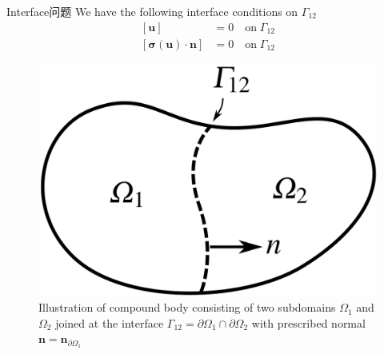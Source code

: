 \documentclass[lang=en,aspectratio=43,theme=default,logo=on]{simplebeamer}
\begin{document}
\begin{frame}{Interface问题}
We have the following interface conditions on $\Gamma_{12}$
\begin{align*}
    \left[\mathbf{u}\right] &=0 \quad \mathrm{on} \; \Gamma_{12} \\
    \left[\boldsymbol{\sigma}(\mathbf{u})\cdot \mathbf{n} \right] &=0 \quad \mathrm{on} \; \Gamma_{12}
\end{align*}
\begin{figure}
\centering %
\includegraphics[height=0.4\textheight]{./img/026.png}
\caption{Illustration of compound body consisting of two subdomains $\Omega_1$ and $\Omega_2$ joined at the interface $\Gamma_{12}=\partial \Omega_1 \cap \partial \Omega_2$ with prescribed normal $\mathbf{n} = \mathbf{n}_{\partial \Omega_1}$}
\end{figure}
\end{frame}
\end{document}
